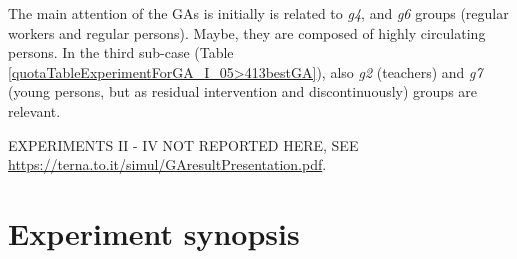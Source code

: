 \documentclass[graybox]{svmult}
\begin{document}
The main attention of the GAs is initially is related to \emph{g4}, and \emph{g6} groups (regular workers and regular persons). Maybe, they are composed of highly circulating persons. In the third sub-case (Table \ref{quotaTableExperimentForGA_I_05>413bestGA}), also \emph{g2} (teachers) and \emph{g7} (young persons, but as residual intervention and discontinuously) groups are relevant.


EXPERIMENTS II - IV NOT REPORTED HERE, SEE \href{https://terna.to.it/simul/GAresultPresentation.pdf}{https://terna.to.it/simul/GAresultPresentation.pdf}.


\section{Experiment synopsis}
\end{document}
